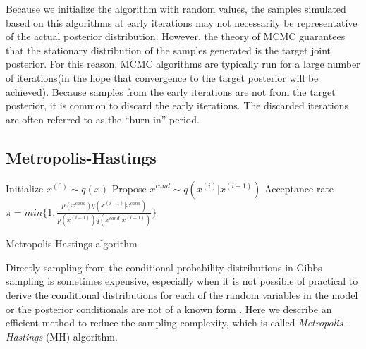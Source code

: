 \documentclass[10pt,journal,cspaper,compsoc]{IEEEtran}
\begin{document}
    Because we initialize the algorithm with random values, the samples simulated based on this algorithms at early iterations may not necessarily be representative of the actual posterior distribution. However, the theory of MCMC guarantees that the stationary distribution of the samples generated is the target joint posterior\cite{gilks1996introducing}. For this reason, MCMC algorithms are typically run for a large number of iterations(in the hope that convergence to the target posterior will be achieved). Because samples from the early iterations are not from the target posterior, it is common to discard the early iterations. The discarded iterations are often referred to as the “burn-in” period.
    
	\subsection{Metropolis-Hastings}
	\begin{algorithm}[t]
		\DontPrintSemicolon
		
		Initialize $x^{(0)} \sim q(x)$\;
		 {
			Propose $x^{cand} \sim q(x^{(i)}|x^{(i-1)})$\;
			Acceptance rate $\pi = min\{1, \frac{p(x^{cand})q(x^{(i-1)}|x^{cand})}
			{p(x^{(i-1)})q(x^{cand}|x^{(i-1)})}\}$\;
		}
		\caption{Metropolis-Hastings algorithm}
		\label{alg:mh_sampling}
	\end{algorithm}
	
	Directly sampling from the conditional probability distributions in Gibbs sampling is sometimes expensive, especially when it is not possible of practical to derive the conditional distributions for each of the random variables in the model or the posterior conditionals are not of a known form .
	Here we describe an efficient method to reduce the sampling complexity, which is called {\em Metropolis-Hastings} (MH) algorithm.
	
\end{document}
